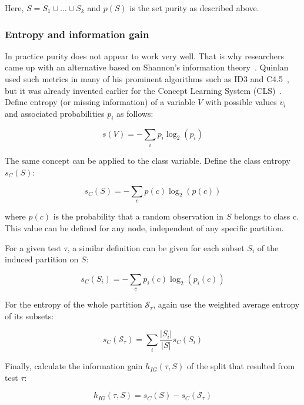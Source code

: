 Here, $S = S_1 \cup \ldots \cup S_k$ and $p(S)$ is the set purity as described above.

\subsubsection{Entropy and information gain}
In practice purity does not appear to work very well. That is why researchers came up with an alternative based on Shannon's information theory~\cite{shannon1948mathematical}. Quinlan used such metrics in many of his prominent algorithms such as ID3 and C4.5~\cite{id3ter, c45}, but it was already invented earlier for the Concept Learning System (CLS)~\cite{cls}. Define entropy (or missing information) of a variable $V$ with possible values $v_i$ and associated probabilities $p_i$ as follows:

\begin{equation}
    s(V) = - \sum_i p_i \log_2(p_i)
\end{equation}

The same concept can be applied to the class variable. Define the class entropy $s_C(S)$:

\begin{equation}
    s_C(S) = - \sum_c p(c) \log_2(p(c))
\end{equation}

where $p(c)$ is the probability that a random observation in $S$ belongs to class c. This value can be defined for any node, independent of any specific partition.

For a given test $\tau$, a similar definition can be given for each subset $S_i$ of the induced partition on $S$:

\begin{equation}
    s_C(S_i) = - \sum_c p_i(c) \log_2(p_i(c))
\end{equation}

For the entropy of the whole partition $\mathcal{S}_\tau$, again use the weighted average entropy of its subsets:

\begin{equation}
    s_C(\mathcal{S}_\tau) = \sum_i \frac{|S_i|}{|S|} s_C(S_i)
\end{equation}

Finally, calculate the information gain $h_{IG}(\tau, S)$ of the split that resulted from test $\tau$:

\begin{equation}
    h_{IG}(\tau, S) = s_C(S) - s_C(\mathcal{S}_\tau)
\end{equation}

